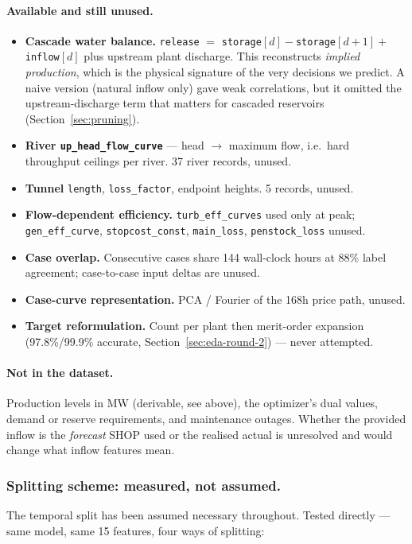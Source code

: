 \paragraph{Available and still unused.}
\begin{itemize}\itemsep1pt
  \item \textbf{Cascade water balance.} \texttt{release} $=$ \texttt{storage}$[d]-$\texttt{storage}$[d{+}1]+$\texttt{inflow}$[d]$
        plus upstream plant discharge. This reconstructs \emph{implied production}, which is the
        physical signature of the very decisions we predict. A naive version (natural inflow only)
        gave weak correlations, but it omitted the upstream-discharge term that matters for
        cascaded reservoirs (Section~\ref{sec:pruning}).
  \item \textbf{River \texttt{up\_head\_flow\_curve}} --- head $\to$ maximum flow, i.e.\ hard
        throughput ceilings per river. 37 river records, unused.
  \item \textbf{Tunnel} \texttt{length}, \texttt{loss\_factor}, endpoint heights. 5 records, unused.
  \item \textbf{Flow-dependent efficiency.} \texttt{turb\_eff\_curves} used only at peak;
        \texttt{gen\_eff\_curve}, \texttt{stopcost\_const}, \texttt{main\_loss},
        \texttt{penstock\_loss} unused.
  \item \textbf{Case overlap.} Consecutive cases share 144 wall-clock hours at 88\% label
        agreement; case-to-case input deltas are unused.
  \item \textbf{Case-curve representation.} PCA / Fourier of the 168h price path, unused.
  \item \textbf{Target reformulation.} Count per plant then merit-order expansion (97.8\%/99.9\%
        accurate, Section~\ref{sec:eda-round-2}) --- never attempted.
\end{itemize}

\paragraph{Not in the dataset.}
Production levels in MW (derivable, see above), the optimizer's dual values, demand or reserve
requirements, and maintenance outages. Whether the provided inflow is the \emph{forecast} SHOP
used or the realised actual is unresolved and would change what inflow features mean.


\subsubsection*{Splitting scheme: measured, not assumed.}
The temporal split has been assumed necessary throughout. Tested directly --- same model, same 15
features, four ways of splitting:

